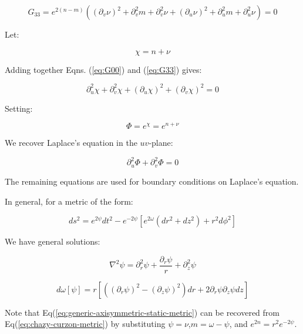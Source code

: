 \documentclass{article}
\begin{document}
\begin{equation}
G_{33}=e^{2(n-m)}\left(\left(\partial_{v}\nu\right)^{2}+\partial_{v}^{2}m+\partial_{v}^{2}\nu+\left(\partial_{u}\nu\right)^{2}+\partial_{u}^{2}m+\partial_{u}^{2}\nu\right)=0\label{eq:G33}
\end{equation}

Let:

\begin{equation}
\chi=n+\nu
\end{equation}


Adding together Eqns. (\ref{eq:G00}) and (\ref{eq:G33}) gives:

\begin{equation}
\partial_{u}^{2}\chi+\partial_{v}^{2}\chi+\left(\partial_{u}\chi\right)^{2}+\left(\partial_{v}\chi\right)^{2}=0
\end{equation}


Setting:

\begin{equation}
\Phi=e^{\chi}=e^{n+\nu}
\end{equation}


We recover Laplace's equation in the $uv$-plane:

\begin{equation}
\partial_{u}^{2}\Phi+\partial_{v}^{2}\Phi=0
\end{equation}


The remaining equations are used for boundary conditions on Laplace's
equation.

In general, for a metric of the form:

\begin{equation}
ds^{2}=e^{2\psi}dt^{2}-e^{-2\psi}\left[e^{2\omega}\left(dr^{2}+dz^{2}\right)+r^{2}d\phi^{2}\right]\label{eq:chazy-curzon-metric}
\end{equation}


We have general solutions:

\begin{equation}
\nabla^{2}\psi=\partial_{r}^{2}\psi+\frac{\partial_{r}\psi}{r}+\partial_{z}^{2}\psi\label{eq:chazy-laplace}
\end{equation}


\begin{equation}
d\omega\left[\psi\right]=r\left[\left(\left(\partial_{r}\psi\right)^{2}-\left(\partial_{z}\psi\right)^{2}\right)dr+2\partial_{r}\psi\partial_{z}\psi dz\right]\label{eq:chazy-laplace-bc}
\end{equation}


Note that Eq(\ref{eq:generic-axisymmetric-static-metric}) can be
recovered from Eq(\ref{eq:chazy-curzon-metric}) by substituting $\psi=\nu$,$m=\omega-\psi$,
and $e^{2n}=r^{2}e^{-2\psi}$.
\end{document}
